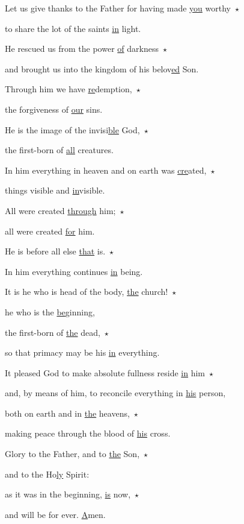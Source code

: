 \noindent Let us give thanks to the Father for having made \uline{you} worthy~$\star$~\nopagebreak

to share the lot of the saints \uline{in} light.

\noindent He rescued us from the power \uline{of} darkness~$\star$~\nopagebreak

and brought us into the kingdom of his belov\uline{ed} Son.

\noindent Through him we have \uline{re}demption,~$\star$~\nopagebreak

the forgiveness of \uline{our} sins.

\noindent He is the image of the invisi\uline{ble} God,~$\star$~\nopagebreak

the first-born of \uline{all} creatures.

\noindent In him everything in heaven and on earth was \uline{cre}ated,~$\star$~\nopagebreak

things visible and \uline{in}visible.

\noindent All were created \uline{through} him;~$\star$~\nopagebreak

all were created \uline{for} him.

\noindent He is before all else \uline{that} is.~$\star$~\nopagebreak

In him everything continues \uline{in} being.

\noindent It is he who is head of the body, \uline{the} church!~$\star$~\nopagebreak

he who is the \uline{be}ginning,

\noindent the first-born of \uline{the} dead,~$\star$~\nopagebreak

so that primacy may be his \uline{in} everything.

\noindent It pleased God to make absolute fullness reside \uline{in} him~$\star$~\nopagebreak

and, by means of him, to reconcile everything in \uline{his} person,

\noindent both on earth and in \uline{the} heavens,~$\star$~\nopagebreak

making peace through the blood of \uline{his} cross.

\noindent Glory to the Father, and to \uline{the} Son,~$\star$~\nopagebreak

and to the Ho\uline{ly} Spirit:

\noindent as it was in the beginning, \uline{is} now,~$\star$~\nopagebreak

and will be for ever. \uline{A}men.
